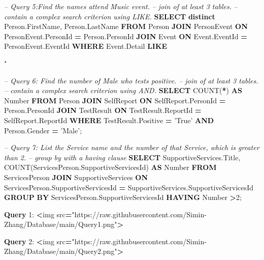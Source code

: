 \documentclass[
]{article}
\newenvironment{Shaded}{\begin{snugshade}}{\end{snugshade}}
\newcommand{\CommentTok}[1]{\textcolor[rgb]{0.56,0.35,0.01}{\textit{#1}}}
\newcommand{\DataTypeTok}[1]{\textcolor[rgb]{0.13,0.29,0.53}{#1}}
\newcommand{\DecValTok}[1]{\textcolor[rgb]{0.00,0.00,0.81}{#1}}
\newcommand{\FunctionTok}[1]{\textcolor[rgb]{0.00,0.00,0.00}{#1}}
\newcommand{\KeywordTok}[1]{\textcolor[rgb]{0.13,0.29,0.53}{\textbf{#1}}}
\newcommand{\NormalTok}[1]{#1}
\newcommand{\OperatorTok}[1]{\textcolor[rgb]{0.81,0.36,0.00}{\textbf{#1}}}
\newcommand{\OtherTok}[1]{\textcolor[rgb]{0.56,0.35,0.01}{#1}}
\newcommand{\StringTok}[1]{\textcolor[rgb]{0.31,0.60,0.02}{#1}}
\begin{document}
\begin{Shaded}
\begin{Highlighting}[]
{{{{{\CommentTok{-- Query 5:Find the names attend Music event.}
\CommentTok{-- join of at least 3 tables.}
\CommentTok{-- contain a complex search criterion using LIKE.}
\KeywordTok{SELECT} \KeywordTok{distinct}\NormalTok{ Person.FirstName, Person.LastName}
 \KeywordTok{FROM}\NormalTok{ Person}
 \KeywordTok{JOIN}\NormalTok{ PersonEvent }\KeywordTok{ON}\NormalTok{ PersonEvent.PersonId }\OperatorTok{=}\NormalTok{ Person.PersonId}
 \KeywordTok{JOIN}\NormalTok{ Event }\KeywordTok{ON}\NormalTok{ Event.EventId }\OperatorTok{=}\NormalTok{ PersonEvent.EventId}
 \KeywordTok{WHERE}\NormalTok{ Event.Detail }\KeywordTok{LIKE} \OtherTok{"%Music%"}\NormalTok{;}


\CommentTok{-- Query 6: Find the number of Male who tests positive.}
\CommentTok{-- join of at least 3 tables.}
\CommentTok{-- contain a complex search criterion using AND.}
\KeywordTok{SELECT} \FunctionTok{COUNT}\NormalTok{(}\OperatorTok{*}\NormalTok{) }\KeywordTok{AS} \DataTypeTok{Number}
\KeywordTok{FROM}\NormalTok{ Person}
\KeywordTok{JOIN}\NormalTok{ SelfReport }\KeywordTok{ON}\NormalTok{ SelfReport.PersonId }\OperatorTok{=}\NormalTok{ Person.PersonId}
\KeywordTok{JOIN}\NormalTok{ TestResult }\KeywordTok{ON}\NormalTok{ TestResult.ReportId }\OperatorTok{=}\NormalTok{ SelfReport.ReportId}
\KeywordTok{WHERE}\NormalTok{ TestResult.Positive }\OperatorTok{=} \StringTok{'True'}
\KeywordTok{AND}\NormalTok{ Person.Gender }\OperatorTok{=} \StringTok{'Male'}\NormalTok{;}


\CommentTok{-- Query 7: List the Service name and the number of that Service, which is greater than 2. }
\CommentTok{-- group by with a having clause}
\KeywordTok{SELECT}\NormalTok{ SupportiveServices.Title, }\FunctionTok{COUNT}\NormalTok{(ServicesPerson.SupportiveServicesId) }\KeywordTok{AS} \DataTypeTok{Number}
\KeywordTok{FROM}\NormalTok{ ServicesPerson}
\KeywordTok{JOIN}\NormalTok{ SupportiveServices }\KeywordTok{ON}\NormalTok{ ServicesPerson.SupportiveServicesId }\OperatorTok{=}\NormalTok{ SupportiveServices.SupportiveServicesId}
\KeywordTok{GROUP} \KeywordTok{BY}\NormalTok{ ServicesPerson.SupportiveServicesId}
\KeywordTok{HAVING} \DataTypeTok{Number} \OperatorTok{>}\DecValTok{2}\NormalTok{;}




\KeywordTok{Query} \DecValTok{1}\NormalTok{:}
\OperatorTok{<}\NormalTok{img src}\OperatorTok{=}\OtherTok{"https://raw.githubusercontent.com/Simin-Zhang/Database/main/Query1.png"}\OperatorTok{>}

\KeywordTok{Query} \DecValTok{2}\NormalTok{:}
\OperatorTok{<}\NormalTok{img src}\OperatorTok{=}\OtherTok{"https://raw.githubusercontent.com/Simin-Zhang/Database/main/Query2.png"}\OperatorTok{>}

}}}}}}
\end{Highlighting}
\end{Shaded}
\end{document}
